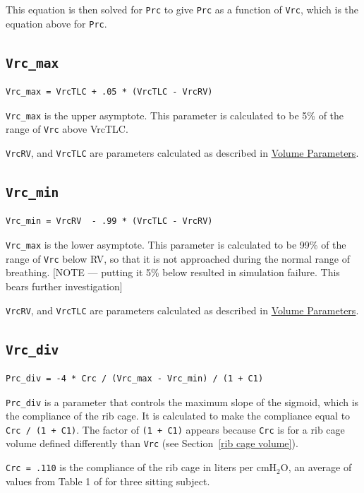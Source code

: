 \documentclass[12pt,openany,oneside]{book}
\begin{document}
This equation is then solved for \verb~Prc~ to give \verb~Prc~ as a
function of \verb~Vrc~, which is the equation above for \verb~Prc~.

\subsection{\texttt{Vrc\_max}}
\begin{verbatim}
Vrc_max = VrcTLC + .05 * (VrcTLC - VrcRV)
\end{verbatim}
\verb~Vrc_max~ is the upper asymptote.  This parameter is calculated
to be 5\% of the range of \verb~Vrc~ above VrcTLC.

\verb~VrcRV~, and \verb~VrcTLC~ are parameters calculated as described
in \hyperref[Volume Parameters]{Volume Parameters}.

\subsection{\texttt{Vrc\_min}}
\begin{verbatim}
Vrc_min = VrcRV  - .99 * (VrcTLC - VrcRV)
\end{verbatim}
\verb~Vrc_max~ is the lower asymptote.  This parameter is calculated
to be 99\% of the range of \verb~Vrc~ below RV, so that it is not
approached during the normal range of breathing.  [NOTE --- putting it
5\% below resulted in simulation failure.  This bears further
investigation]

\verb~VrcRV~, and \verb~VrcTLC~ are parameters calculated as described
in \hyperref[Volume Parameters]{Volume Parameters}.

\subsection{\texttt{Vrc\_div}}
\begin{verbatim}
Prc_div = -4 * Crc / (Vrc_max - Vrc_min) / (1 + C1)
\end{verbatim}

\verb~Prc_div~ is a parameter that controls the maximum slope of the
sigmoid, which is the compliance of the rib cage.  It is calculated to
make the compliance equal to \verb~Crc / (1 + C1)~.  The factor of
\verb~(1 + C1)~ appears because \verb~Crc~ is for a rib cage volume
defined differently than \verb~Vrc~ (see Section~\ref{rib cage volume}).

\verb~Crc = .110~ is the compliance of the rib cage in liters per
cmH$_2$O, an average of values from Table 1 of \citet{Gilroy01061985}
for three sitting subject.
\end{document}
